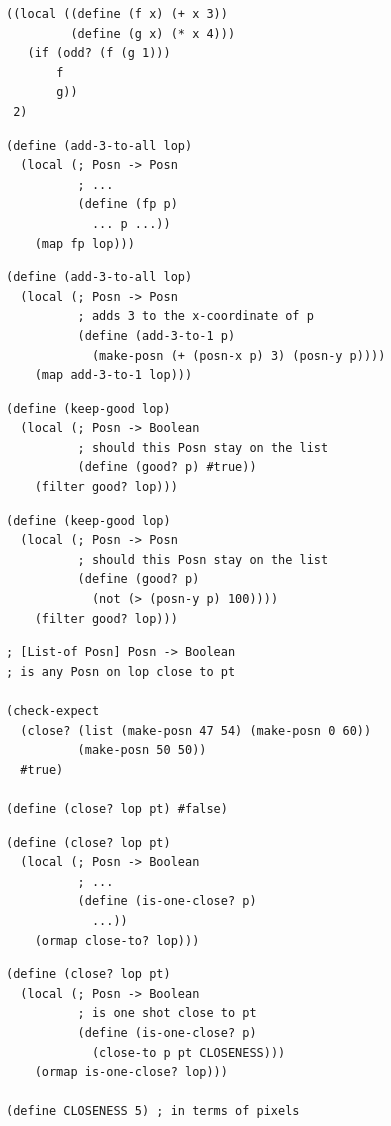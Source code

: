 \begin{lstlisting}[language=BSL]
((local ((define (f x) (+ x 3))
         (define (g x) (* x 4)))
   (if (odd? (f (g 1)))
       f
       g))
 2)
\end{lstlisting}

\begin{lstlisting}[language=BSL]
(define (add-3-to-all lop)
  (local (; Posn -> Posn
          ; ...
          (define (fp p)
            ... p ...))
    (map fp lop)))
\end{lstlisting}

\begin{lstlisting}[language=BSL]
(define (add-3-to-all lop)
  (local (; Posn -> Posn
          ; adds 3 to the x-coordinate of p
          (define (add-3-to-1 p)
            (make-posn (+ (posn-x p) 3) (posn-y p))))
    (map add-3-to-1 lop)))
\end{lstlisting}

\begin{lstlisting}[language=BSL]
(define (keep-good lop)
  (local (; Posn -> Boolean
          ; should this Posn stay on the list
          (define (good? p) #true))
    (filter good? lop)))
\end{lstlisting}

\begin{lstlisting}[language=BSL]
(define (keep-good lop)
  (local (; Posn -> Posn
          ; should this Posn stay on the list
          (define (good? p)
            (not (> (posn-y p) 100))))
    (filter good? lop)))
\end{lstlisting}

\begin{lstlisting}[language=BSL]
; [List-of Posn] Posn -> Boolean
; is any Posn on lop close to pt

(check-expect
  (close? (list (make-posn 47 54) (make-posn 0 60))
          (make-posn 50 50))
  #true)

(define (close? lop pt) #false)
\end{lstlisting}

\begin{lstlisting}[language=BSL]
(define (close? lop pt)
  (local (; Posn -> Boolean
          ; ...
          (define (is-one-close? p)
            ...))
    (ormap close-to? lop)))
\end{lstlisting}

\begin{lstlisting}[language=BSL]
(define (close? lop pt)
  (local (; Posn -> Boolean
          ; is one shot close to pt
          (define (is-one-close? p)
            (close-to p pt CLOSENESS)))
    (ormap is-one-close? lop)))

(define CLOSENESS 5) ; in terms of pixels
\end{lstlisting}

